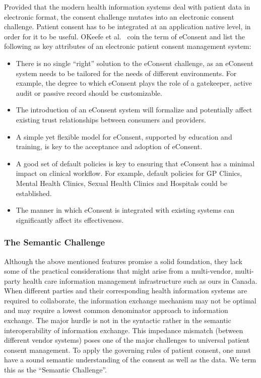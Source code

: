 \documentclass[conference]{IEEEtran}
\begin{document}
Provided that the modern health information systems deal with patient data in electronic format, the consent challenge mutates into an electronic consent
challenge.  Patient consent has to be integrated at an application native level, in order for it to be useful. OKeefe et al.~\cite{okeefe2002implementation}
coin the term of eConsent and list the following as key attributes of an electronic patient consent management system:

\begin{itemize}
 \item There is no single “right” solution to the eConsent challenge, as an eConsent system needs to be tailored for the needs of different environments. For
example, the degree to which eConsent plays the role of a gatekeeper, active audit or passive record should be customizable. 
\item The introduction of an eConsent system will formalize and potentially affect existing trust relationships between consumers and providers. 
\item A simple yet flexible model for eConsent, supported by education and training, is key to the acceptance and adoption of eConsent. 
\item A good set of default policies is key to ensuring that eConsent has a minimal impact on clinical workflow. For example, default policies for GP Clinics,
Mental Health Clinics, Sexual Health Clinics and Hospitals could be established. 
\item The manner in which eConsent is integrated with existing systems can significantly affect its effectiveness. 
\end{itemize}

\subsubsection*{The Semantic Challenge}
Although the above mentioned features promise a solid foundation, they lack some of the practical considerations that might arise from a multi-vendor,
multi-party health care information management infrastructure such as ours in Canada.  When different parties and their corresponding health information systems
are required to collaborate, the information exchange mechanism may not be optimal and may require a lowest common denominator approach to information exchange.
 The major hurdle is not in the syntactic rather in the semantic interoperability of information exchange.  This impedance mismatch (between different vendor
systems) poses one of the major challenges to universal patient consent management. To apply the governing rules of patient consent, one must have a sound
semantic understanding of the consent as well as the data.  We term this as the “Semantic Challenge”.  
\end{document}
